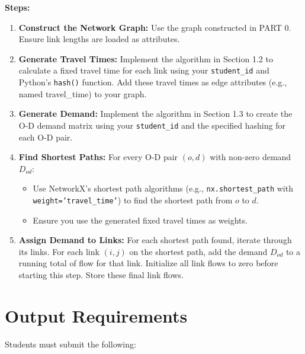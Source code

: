 \documentclass{rapportCS} %
\begin{document}
\textbf{Steps:}
\begin{enumerate}
    \item \textbf{Construct the Network Graph:} Use the graph constructed in PART 0. Ensure link lengths are loaded as attributes.
    \item \textbf{Generate Travel Times:} Implement the algorithm in Section 1.2 to calculate a fixed travel time for each link using your \texttt{student\_id} and Python's \texttt{hash()} function. Add these travel times as edge attributes (e.g., named travel\_time) to your graph.
    \item \textbf{Generate Demand:} Implement the algorithm in Section 1.3 to create the O-D demand matrix using your \texttt{student\_id} and the specified hashing for each O-D pair.
    \item \textbf{Find Shortest Paths:} For every O-D pair \( (o, d) \) with non-zero demand \( D_{od} \):
    \begin{itemize}
        \item Use NetworkX's shortest path algorithms (e.g., \texttt{nx.shortest\_path} with \texttt{weight='travel\_time'}) to find the shortest path from \( o \) to \( d \).
        \item Ensure you use the generated fixed travel times as weights.
    \end{itemize}
    \item \textbf{Assign Demand to Links:} For each shortest path found, iterate through its links. For each link \( (i, j) \) on the shortest path, add the demand \( D_{od} \) to a running total of flow for that link. Initialize all link flows to zero before starting this step. Store these final link flows.
\end{enumerate}

\newpage
\section{Output Requirements}


Students must submit the following:
\end{document}

